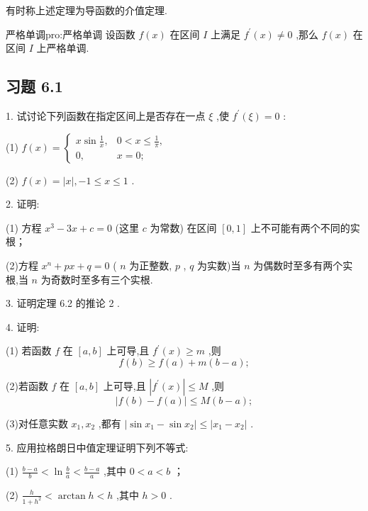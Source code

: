 有时称上述定理为导函数的介值定理.

\begin{corollary}{严格单调}{pro:严格单调}
设函数 \(f\left( x\right)\) 在区间 \(I\) 上满足 \({f}^{\prime }\left( x\right)  \neq  0\) ,那么 \(f\left( x\right)\) 在区间 \(I\) 上严格单调.
\end{corollary}


\subsection{习题 6.1}

1. 试讨论下列函数在指定区间上是否存在一点 \(\xi\) ,使 \({f}^{\prime }\left( \xi \right)  = 0\) :

(1) \(f\left( x\right)  = \left\{  \begin{array}{ll} x\sin \frac{1}{x}, & 0 < x \leq  \frac{1}{\pi }, \\  0, & x = 0; \end{array}\right.\)

(2) \(f\left( x\right)  = \left| x\right| , - 1 \leq  x \leq  1\) .

2. 证明:

(1) 方程 \({x}^{3} - {3x} + c = 0\) (这里 \(c\) 为常数) 在区间 \(\left\lbrack  {0,1}\right\rbrack\) 上不可能有两个不同的实根；

(2)方程 \({x}^{n} + {px} + q = 0\) ( \(n\) 为正整数, \(p\) , \(q\) 为实数)当 \(n\) 为偶数时至多有两个实根,当 \(n\) 为奇数时至多有三个实根.

3. 证明定理 6.2 的推论 2 .

4. 证明:

(1) 若函数 \(f\) 在 \(\left\lbrack  {a,b}\right\rbrack\) 上可导,且 \({f}^{\prime }\left( x\right)  \geq  m\) ,则
\[
f\left( b\right)  \geq  f\left( a\right)  + m\left( {b - a}\right) ;
\]

(2)若函数 \(f\) 在 \(\left\lbrack  {a,b}\right\rbrack\) 上可导,且 \(\left| {{f}^{\prime }\left( x\right) }\right|  \leq  M\) ,则
\[
\left| {f\left( b\right)  - f\left( a\right) }\right|  \leq  M\left( {b - a}\right) ;
\]

(3)对任意实数 \({x}_{1},{x}_{2}\) ,都有 \(\left| {\sin {x}_{1} - \sin {x}_{2}}\right|  \leq  \left| {{x}_{1} - {x}_{2}}\right|\) .

5. 应用拉格朗日中值定理证明下列不等式:

(1) \(\frac{b - a}{b} < \ln \frac{b}{a} < \frac{b - a}{a}\) ,其中 \(0 < a < b\) ；

(2) \(\frac{h}{1 + {h}^{2}} < \arctan h < h\) ,其中 \(h > 0\) .

